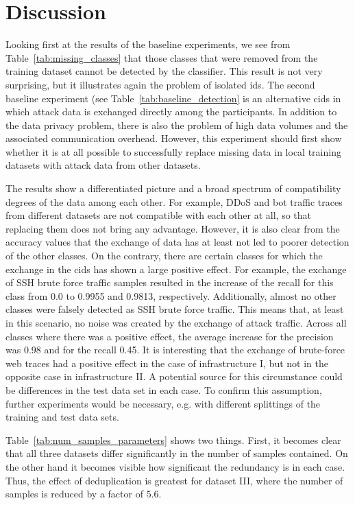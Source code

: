 \documentclass[../../main.tex]{subfiles}
\begin{document}
\section{Discussion}

Looking first at the results of the baseline experiments, we see from Table~\ref{tab:missing_classes} that those classes that were removed from the training dataset cannot be detected by the classifier. This result is not very surprising, but it illustrates again the problem of isolated \gls{ids}. The second baseline experiment (see Table~\ref{tab:baseline_detection} is an alternative \gls{cids} in which attack data is exchanged directly among the participants. In addition to the data privacy problem, there is also the problem of high data volumes and the associated communication overhead. However, this experiment should first show whether it is at all possible to successfully replace missing data in local training datasets with attack data from other datasets. 

The results show a differentiated picture and a broad spectrum of compatibility degrees of the data among each other. For example, DDoS and bot traffic traces from different datasets are not compatible with each other at all, so that replacing them does not bring any advantage. However, it is also clear from the accuracy values that the exchange of data has at least not led to poorer detection of the other classes. On the contrary, there are certain classes for which the exchange in the \gls{cids} has shown a large positive effect. For example, the exchange of SSH brute force traffic samples resulted in the increase of the recall for this class from 0.0 to 0.9955 and 0.9813, respectively. Additionally, almost no other classes were falsely detected as SSH brute force traffic. This means that, at least in this scenario, no noise was created by the exchange of attack traffic. Across all classes where there was a positive effect, the average increase for the precision was 0.98 and for the recall 0.45. It is interesting that the exchange of brute-force web traces had a positive effect in the case of infrastructure I, but not in the opposite case in infrastructure II. A potential source for this circumstance could be differences in the test data set in each case. To confirm this assumption, further experiments would be necessary, e.g. with different splittings of the training and test data sets.  

Table~\ref{tab:num_samples_parameters} shows two things. First, it becomes clear that all three datasets differ significantly in the number of samples contained. On the other hand it becomes visible how significant the redundancy is in each case. Thus, the effect of deduplication is greatest for dataset III, where the number of samples is reduced by a factor of $5.6$.
\end{document}
